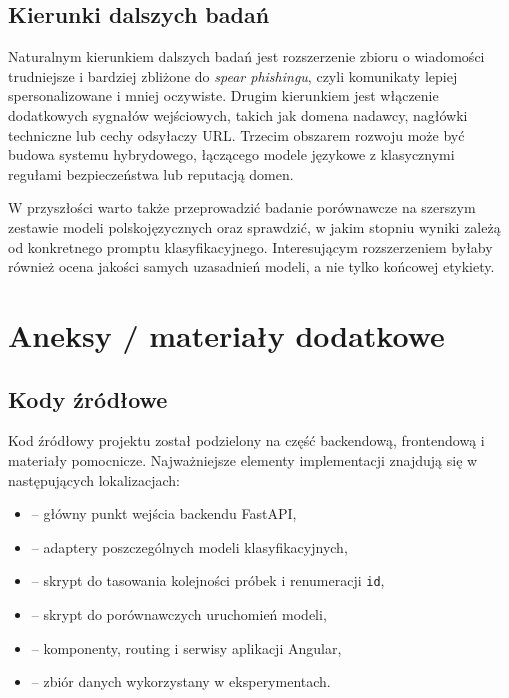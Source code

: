 \documentclass[12pt,a4paper,openany]{report}
\begin{document}
\section{Kierunki dalszych badań}

Naturalnym kierunkiem dalszych badań jest rozszerzenie zbioru o wiadomości trudniejsze i bardziej zbliżone do \textit{spear phishingu}, czyli komunikaty lepiej spersonalizowane i mniej oczywiste. Drugim kierunkiem jest włączenie dodatkowych sygnałów wejściowych, takich jak domena nadawcy, nagłówki techniczne lub cechy odsyłaczy URL. Trzecim obszarem rozwoju może być budowa systemu hybrydowego, łączącego modele językowe z klasycznymi regułami bezpieczeństwa lub reputacją domen.

W przyszłości warto także przeprowadzić badanie porównawcze na szerszym zestawie modeli polskojęzycznych oraz sprawdzić, w jakim stopniu wyniki zależą od konkretnego promptu klasyfikacyjnego. Interesującym rozszerzeniem byłaby również ocena jakości samych uzasadnień modeli, a nie tylko końcowej etykiety.

\printbibliography[heading=bibnumbered,title={Bibliografia}]

\chapter{Aneksy / materiały dodatkowe}

\section{Kody źródłowe}

Kod źródłowy projektu został podzielony na część backendową, frontendową i materiały pomocnicze. Najważniejsze elementy implementacji znajdują się w następujących lokalizacjach:

\begin{itemize}
    \item {} -- główny punkt wejścia backendu FastAPI,
    \item {} -- adaptery poszczególnych modeli klasyfikacyjnych,
    \item {} -- skrypt do tasowania kolejności próbek i renumeracji \texttt{id},
    \item {} -- skrypt do porównawczych uruchomień modeli,
    \item {} -- komponenty, routing i serwisy aplikacji Angular,
    \item {} -- zbiór danych wykorzystany w eksperymentach.
\end{itemize}
\end{document}

